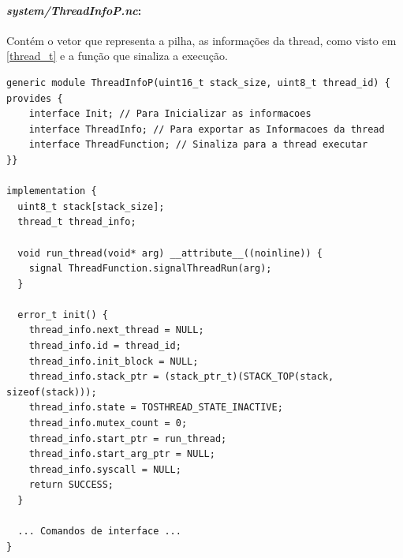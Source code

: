\paragraph{\textit{system/ThreadInfoP.nc}:}\label{ThreadInfoP} Contém o vetor que representa a pilha, as informações da thread,
como visto em \ref{thread_t} e a função que sinaliza a execução.
\begin{lstlisting}
generic module ThreadInfoP(uint16_t stack_size, uint8_t thread_id) { 
provides {
    interface Init; // Para Inicializar as informacoes
    interface ThreadInfo; // Para exportar as Informacoes da thread
    interface ThreadFunction; // Sinaliza para a thread executar 
}}

implementation {
  uint8_t stack[stack_size];
  thread_t thread_info;

  void run_thread(void* arg) __attribute__((noinline)) {
    signal ThreadFunction.signalThreadRun(arg);
  }
  
  error_t init() {
    thread_info.next_thread = NULL;
    thread_info.id = thread_id;
    thread_info.init_block = NULL;
    thread_info.stack_ptr = (stack_ptr_t)(STACK_TOP(stack, sizeof(stack)));
    thread_info.state = TOSTHREAD_STATE_INACTIVE;
    thread_info.mutex_count = 0;
    thread_info.start_ptr = run_thread;
    thread_info.start_arg_ptr = NULL;
    thread_info.syscall = NULL;
    return SUCCESS;
  }

  ... Comandos de interface ...
}
\end{lstlisting} 

